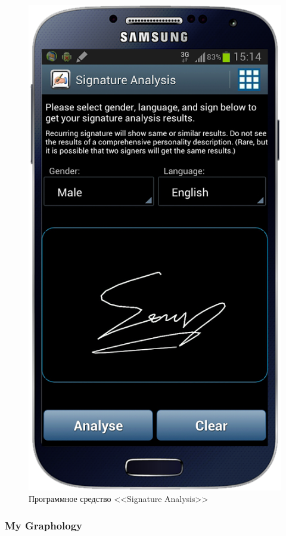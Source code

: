 \begin{figure}[ht]{}
    \centering
    \includegraphics[height=0.4\textheight]{figures/analog_signature_analysis.png}
    \caption{Программное средство <<Signature Analysis>>}
    \label{fig:domain:analogs:signature_analysis}
\end{figure}

\subsubsection{My Graphology}
\label{sub:domain:analogs:my_graphology}


